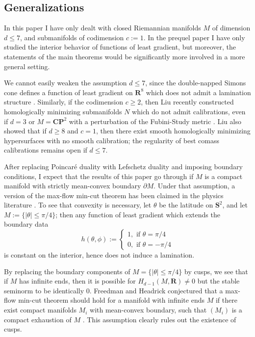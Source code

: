 \documentclass[reqno,11pt]{amsart}
\newcommand{\RR}{\mathbf{R}}
\newcommand{\CC}{\mathbf{C}}
\newcommand{\PP}{\mathbf P}
\newcommand{\Sph}{\mathbf S}
\theoremstyle{definition}
\numberwithin{equation}{section}
\begin{document}
\subsection{Generalizations}
In this paper I have only dealt with closed Riemannian manifolds $M$ of dimension $d \leq 7$, and submanifolds of codimension $c := 1$.
In the prequel paper \cite{BackusCML} I have only studied the interior behavior of functions of least gradient, but moreover, the statements of the main theorems would be significantly more involved in a more general setting.

We cannot easily weaken the assumption $d \leq 7$, since the double-napped Simons cone defines a function of least gradient on $\RR^8$ which does not admit a lamination structure \cite{BackusCML}.
Similarly, if the codimension $c \geq 2$, then Liu recently constructed homologically minimizing submanifolds $N$ which do not admit calibrations, even if $d = 3$ or $M = \CC \PP^2$ with a perturbation of the Fubini-Study metric \cite{liu2023homologically}.
Liu also showed that if $d \geq 8$ and $c = 1$, then there exist smooth homologically minimizing hypersurfaces with no smooth calibration; the regularity of best comass calibrations remains open if $d \leq 7$.

After replacing Poincar\'e duality with Lefschetz duality and imposing boundary conditions, I expect that the results of this paper go through if $M$ is a compact manifold with strictly mean-convex boundary $\partial M$.
Under that assumption, a version of the max-flow min-cut theorem has been claimed in the physics literature \cite[Appendix A]{Freedman_2016}.
To see that convexity is necessary, let $\theta$ be the latitude on $\Sph^2$, and let $M := \{|\theta| \leq \pi/4\}$; then any function of least gradient which extends the boundary data 
$$h(\theta, \phi) := \begin{cases} 1, \text{ if } \theta = \pi/4 \\ 0, \text{ if } \theta = -\pi/4\end{cases}$$
is constant on the interior, hence does not induce a lamination.

By replacing the boundary components of $M = \{|\theta| \leq \pi/4\}$ by cusps, we see that if $M$ has infinite ends, then it is possible for $H_{d - 1}(M, \RR) \neq 0$ but the stable seminorm to be identically $0$.
Freedman and Headrick conjectured that a max-flow min-cut theorem should hold for a manifold with infinite ends $M$ if there exist compact manifolds $M_i$ with mean-convex boundary, such that $(M_i)$ is a compact exhaustion of $M$ \cite[Appendix A]{Freedman_2016}.
This assumption clearly rules out the existence of cusps.
\end{document}
